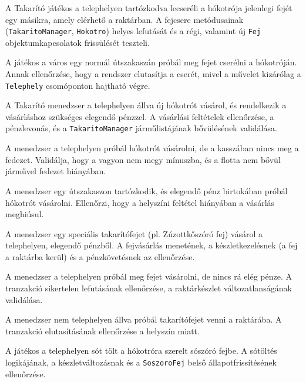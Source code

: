 {A Takarító játékos a telephelyen tartózkodva lecseréli a hókotrója jelenlegi fejét egy másikra, amely elérhető a raktárban.}
{A fejcsere metódusainak (\texttt{TakaritoManager}, \texttt{Hokotro}) helyes lefutását és a régi, valamint új \texttt{Fej} objektumkapcsolatok frissülését teszteli.}

{A játékos a város egy normál útszakaszán próbál meg fejet cserélni a hókotróján.}
{Annak ellenőrzése, hogy a rendszer elutasítja a cserét, mivel a művelet kizárólag a \texttt{Telephely} csomóponton hajtható végre.}

{A Takarító menedzser a telephelyen állva új hókotrót vásárol, és rendelkezik a vásárláshoz szükséges elegendő pénzzel.}
{A vásárlási feltételek ellenőrzése, a pénzlevonás, és a \texttt{TakaritoManager} járműlistájának bővülésének validálása.}

{A menedzser a telephelyen próbál hókotrót vásárolni, de a kasszában nincs meg a fedezet.}
{Validálja, hogy a vagyon nem megy mínuszba, és a flotta nem bővül járművel fedezet hiányában.}

{A menedzser egy útszakaszon tartózkodik, és elegendő pénz birtokában próbál hókotrót vásárolni.}
{Ellenőrzi, hogy a helyszíni feltétel hiányában a vásárlás meghiúsul.}

{A menedzser egy speciális takarítófejet (pl. Zúzottkőszóró fej) vásárol a telephelyen, elegendő pénzből.}
{A fejvásárlás menetének, a készletkezelésnek (a fej a raktárba kerül) és a pénzkövetésnek az ellenőrzése.}

{A menedzser a telephelyen próbál meg fejet vásárolni, de nincs rá elég pénze.}
{A tranzakció sikertelen lefutásának ellenőrzése, a raktárkészlet változatlanságának validálása.}

{A menedzser nem telephelyen állva próbál takarítófejet venni a raktárába.}
{A tranzakció elutasításának ellenőrzése a helyszín miatt.}

{A játékos a telephelyen sót tölt a hókotróra szerelt sószóró fejbe.}
{A sótöltés logikájának, a készletváltozásnak és a \texttt{SoszoroFej} belső állapotfrissítésének ellenőrzése.}

